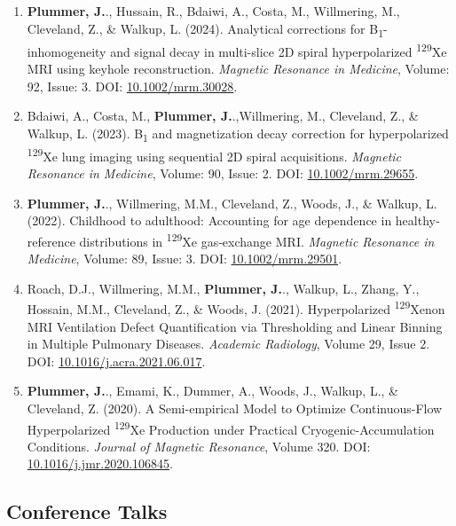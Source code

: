 \documentclass[12pt,]{scrartcl}
\begin{document}
\begin{enumerate}
    \item  \textbf{Plummer, J.}., Hussain, R., Bdaiwi, A., Costa, M., Willmering, M., Cleveland, Z., \& Walkup, L. (2024). Analytical corrections for B\textsubscript{1}-inhomogeneity and signal decay in multi-slice 2D spiral hyperpolarized \textsuperscript{129}Xe MRI using keyhole reconstruction. \textit{Magnetic Resonance in Medicine}, Volume: 92, Issue: 3. 
    DOI: \href{https://doi.org/10.1002/mrm.30028}{10.1002/mrm.30028}.
    
    \item  Bdaiwi, A., Costa, M., \textbf{Plummer, J.}.,Willmering, M., Cleveland, Z., \& Walkup, L. (2023). B\textsubscript{1} and magnetization decay correction for hyperpolarized \textsuperscript{129}Xe lung imaging using sequential 2D spiral acquisitions. \textit{Magnetic Resonance in Medicine}, Volume: 90, Issue: 2. DOI: \href{ https://doi.org/10.1002/mrm.29655}{ 10.1002/mrm.29655}.
    
    \item \textbf{Plummer, J.}., Willmering, M.M., Cleveland, Z., Woods, J., \& Walkup, L. (2022). Childhood to adulthood: Accounting for age dependence in healthy‐reference distributions in \textsuperscript{129}Xe gas‐exchange MRI. \textit{Magnetic Resonance in Medicine}, Volume: 89, Issue: 3. DOI: \href{https://onlinelibrary.wiley.com/share/GVTXYDIF3Y2VPZRHQRIK?target=10.1002/mrm.29501}{10.1002/mrm.29501}.
    
    \item Roach, D.J., Willmering, M.M., \textbf{Plummer, J.}., Walkup, L., Zhang, Y., Hossain, M.M., Cleveland, Z., \& Woods, J. (2021). Hyperpolarized \textsuperscript{129}Xenon MRI Ventilation Defect Quantification via Thresholding and Linear Binning in Multiple Pulmonary Diseases. \textit{Academic Radiology}, Volume 29, Issue 2. DOI: \href{https://doi.org/10.1016/j.acra.2021.06.017}{10.1016/j.acra.2021.06.017}.
    
    \item \textbf{Plummer, J.}., Emami, K., Dummer, A., Woods, J., Walkup, L., \& Cleveland, Z. (2020). A Semi-empirical Model to Optimize Continuous-Flow Hyperpolarized \textsuperscript{129}Xe Production under Practical Cryogenic-Accumulation Conditions. \textit{Journal of Magnetic Resonance}, Volume 320. DOI: \href{https://doi.org/10.1016/j.jmr.2020.106845}{10.1016/j.jmr.2020.106845}.

\end{enumerate}

\subsection{Conference Talks}\label{conferences_presentations}
\end{document}
